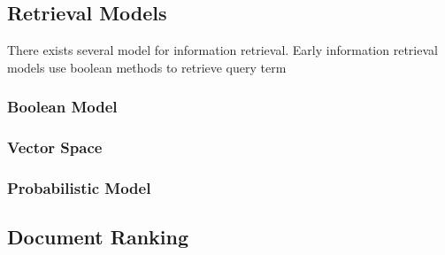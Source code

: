 \subsection{Retrieval Models}
There exists several model for information retrieval. Early information retrieval models use boolean methods to retrieve query term
\subsubsection{Boolean Model} 
\subsubsection{Vector Space}
\subsubsection{Probabilistic Model}

\subsection{Document Ranking}


